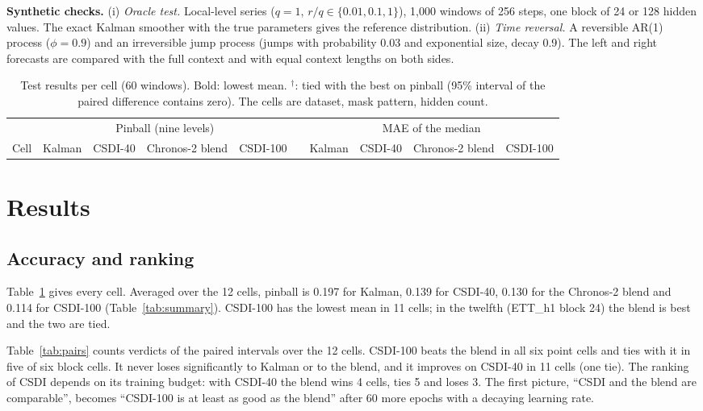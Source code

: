 \documentclass[10pt,twocolumn]{article}
\newcommand{\Chr}{Chronos-2}
\begin{document}
\textbf{Synthetic checks.} (i) \emph{Oracle test.} Local-level series ($q=1$, $r/q\in\{0.01,0.1,1\}$), 1,000 windows of 256 steps, one block of 24 or 128 hidden values. The exact Kalman smoother with the true parameters gives the reference distribution. (ii) \emph{Time reversal.} A reversible AR(1) process ($\phi=0.9$) and an irreversible jump process (jumps with probability 0.03 and exponential size, decay 0.9). The left and right forecasts are compared with the full context and with equal context lengths on both sides.

\begin{table}[t]
\centering\small
\setlength{\tabcolsep}{5pt}
\begin{tabular}{@{}l cccc c cccc@{}}
\toprule
 & \multicolumn{4}{c}{Pinball (nine levels)} & & \multicolumn{4}{c}{MAE of the median}\\
\cmidrule(lr){2-5}\cmidrule(l){7-10}
Cell & Kalman & CSDI-40 & \Chr{} blend & CSDI-100 & & Kalman & CSDI-40 & \Chr{} blend & CSDI-100\\
\midrule

\end{tabular}
\caption{Test results per cell (60 windows). Bold: lowest mean. $^\dagger$: tied with the best on pinball (95\% interval of the paired difference contains zero). The cells are dataset, mask pattern, hidden count.}
\label{tab:main}
\end{table}

\section{Results}\label{sec:results}
\subsection{Accuracy and ranking}
Table~\ref{tab:main} gives every cell. Averaged over the 12 cells, pinball is 0.197 for Kalman, 0.139 for CSDI-40, 0.130 for the \Chr{} blend and 0.114 for CSDI-100 (Table~\ref{tab:summary}). CSDI-100 has the lowest mean in 11 cells; in the twelfth (ETT\_h1 block 24) the blend is best and the two are tied.

Table~\ref{tab:pairs} counts verdicts of the paired intervals over the 12 cells. CSDI-100 beats the blend in all six point cells and ties with it in five of six block cells. It never loses significantly to Kalman or to the blend, and it improves on CSDI-40 in 11 cells (one tie). The ranking of CSDI depends on its training budget: with CSDI-40 the blend wins 4 cells, ties 5 and loses 3. The first picture, ``CSDI and the blend are comparable'', becomes ``CSDI-100 is at least as good as the blend'' after 60 more epochs with a decaying learning rate.
\end{document}
